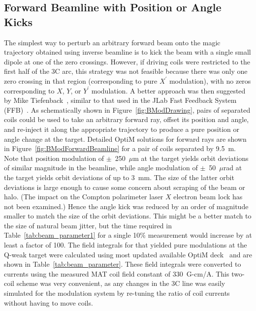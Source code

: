 \subsection{Forward Beamline with Position or Angle Kicks}
\label{Forward Beamline with Position or Angle Kicks}
The simplest way to perturb an arbitrary forward beam onto the magic trajectory obtained using inverse beamline is to kick the beam with a single small dipole at one of the zero crossings.  However, if driving coils were restricted to the first half of the 3C arc, this strategy was not feasible because there was only one zero crossing in that region (corresponding to pure $X^\prime$ modulation), with no zeros corresponding to $X$, $Y$, or $Y^\prime$ modulation.  A better approach was then suggested by Mike Tiefenback~\cite{tiefenback_communication}, similar to that used in the JLab Fast Feedback System (FFB)~\cite{jlab_ffb1,jlab_ffb2}. As schematically shown in Figure~\ref{fig:BModDrawing}, pairs of separated coils could be used to take an arbitrary forward ray, offset its position and angle, and re-inject it along the appropriate trajectory to produce a pure position or angle change at the target. Detailed OptiM solutions for forward rays are shown in Figure~\ref{fig:BModForwardBeamline} for a pair of coils separated by 9.5~m. Note that position modulation of $\pm$~250~$\mu$m at the target yields orbit deviations of similar magnitude in the beamline, while angle modulation of $\pm$~50~$\mu$rad at the target yields orbit deviations of up to 3~mm.  The size of the latter orbit deviations is large enough to cause some concern about scraping of the beam or halo. (The impact on the Compton polarimeter laser $X$ electron beam lock has not been examined.) 
Hence the angle kick was reduced by an order of magnitude smaller to match the size of the orbit deviations. This might be a better match to the size of natural beam jitter, but the time required in Table~\ref{tab:beam_parameter1} for a single 10\% measurement would increase by at least a factor of 100. The field integrals for that yielded pure modulations at the Q-weak target were calculated using most updated available OptiM deck~\cite{optim_deck} and are shown in Table~\ref{tab:beam_parameter}.
These field integrals were converted to currents using the measured MAT coil field constant of 330~G-cm/A. This two-coil scheme was very convenient, as any changes in the 3C line was easily simulated for the modulation system by re-tuning the ratio of coil currents without having to move coils.

